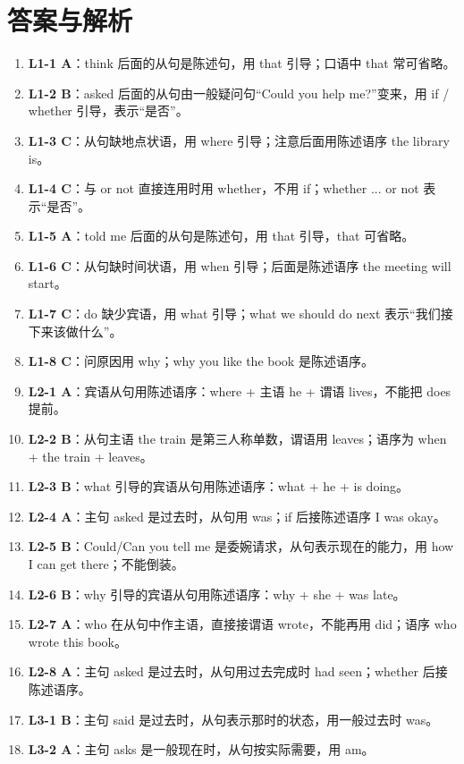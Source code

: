 \documentclass[11pt,a4paper]{ctexart}
\begin{document}
\section*{答案与解析}
\small
\begin{enumerate}[leftmargin=1.6em,itemsep=2pt]
\item \textbf{L1-1 A}：think 后面的从句是陈述句，用 that 引导；口语中 that 常可省略。
\item \textbf{L1-2 B}：asked 后面的从句由一般疑问句“Could you help me?”变来，用 if / whether 引导，表示“是否”。
\item \textbf{L1-3 C}：从句缺地点状语，用 where 引导；注意后面用陈述语序 the library is。
\item \textbf{L1-4 C}：与 or not 直接连用时用 whether，不用 if；whether ... or not 表示“是否”。
\item \textbf{L1-5 A}：told me 后面的从句是陈述句，用 that 引导，that 可省略。
\item \textbf{L1-6 C}：从句缺时间状语，用 when 引导；后面是陈述语序 the meeting will start。
\item \textbf{L1-7 C}：do 缺少宾语，用 what 引导；what we should do next 表示“我们接下来该做什么”。
\item \textbf{L1-8 C}：问原因用 why；why you like the book 是陈述语序。
\item \textbf{L2-1 A}：宾语从句用陈述语序：where + 主语 he + 谓语 lives，不能把 does 提前。
\item \textbf{L2-2 B}：从句主语 the train 是第三人称单数，谓语用 leaves；语序为 when + the train + leaves。
\item \textbf{L2-3 B}：what 引导的宾语从句用陈述语序：what + he + is doing。
\item \textbf{L2-4 A}：主句 asked 是过去时，从句用 was；if 后接陈述语序 I was okay。
\item \textbf{L2-5 B}：Could/Can you tell me 是委婉请求，从句表示现在的能力，用 how I can get there；不能倒装。
\item \textbf{L2-6 B}：why 引导的宾语从句用陈述语序：why + she + was late。
\item \textbf{L2-7 A}：who 在从句中作主语，直接接谓语 wrote，不能再用 did；语序 who wrote this book。
\item \textbf{L2-8 A}：主句 asked 是过去时，从句用过去完成时 had seen；whether 后接陈述语序。
\item \textbf{L3-1 B}：主句 said 是过去时，从句表示那时的状态，用一般过去时 was。
\item \textbf{L3-2 A}：主句 asks 是一般现在时，从句按实际需要，用 am。

\end{enumerate}
\end{document}
